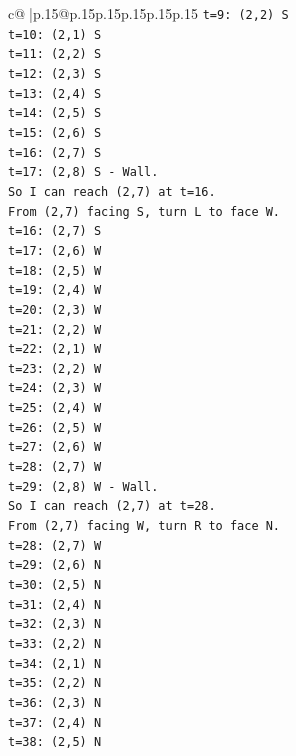 \documentclass{article}
\begin{document}
{\begin{supertabular}{c@{$\;$}|p{.15\linewidth}@{}p{.15\linewidth}p{.15\linewidth}p{.15\linewidth}p{.15\linewidth}p{.15\linewidth}}
{{{\texttt{t=9: (2,2) S} \\
\texttt{t=10: (2,1) S} \\
\texttt{t=11: (2,2) S} \\
\texttt{t=12: (2,3) S} \\
\texttt{t=13: (2,4) S} \\
\texttt{t=14: (2,5) S} \\
\texttt{t=15: (2,6) S} \\
\texttt{t=16: (2,7) S} \\
\texttt{t=17: (2,8) S {-} Wall.} \\
\texttt{So I can reach (2,7) at t=16.} \\
\texttt{From (2,7) facing S, turn L to face W.} \\
\texttt{t=16: (2,7) S} \\
\texttt{t=17: (2,6) W} \\
\texttt{t=18: (2,5) W} \\
\texttt{t=19: (2,4) W} \\
\texttt{t=20: (2,3) W} \\
\texttt{t=21: (2,2) W} \\
\texttt{t=22: (2,1) W} \\
\texttt{t=23: (2,2) W} \\
\texttt{t=24: (2,3) W} \\
\texttt{t=25: (2,4) W} \\
\texttt{t=26: (2,5) W} \\
\texttt{t=27: (2,6) W} \\
\texttt{t=28: (2,7) W} \\
\texttt{t=29: (2,8) W {-} Wall.} \\
\texttt{So I can reach (2,7) at t=28.} \\
\texttt{From (2,7) facing W, turn R to face N.} \\
\texttt{t=28: (2,7) W} \\
\texttt{t=29: (2,6) N} \\
\texttt{t=30: (2,5) N} \\
\texttt{t=31: (2,4) N} \\
\texttt{t=32: (2,3) N} \\
\texttt{t=33: (2,2) N} \\
\texttt{t=34: (2,1) N} \\
\texttt{t=35: (2,2) N} \\
\texttt{t=36: (2,3) N} \\
\texttt{t=37: (2,4) N} \\
\texttt{t=38: (2,5) N} \\
}}}
\end{supertabular}}
\end{document}
